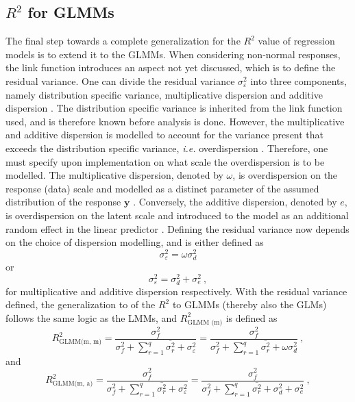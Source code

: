 \subsection{$R^2$ for GLMMs}
\label{sec:R2GLMM}
The final step towards a complete generalization for the $R^2$ value of regression models is to extend it to the GLMMs. 
When considering non-normal responses, the link function introduces an aspect not yet discussed, which is to define the residual variance.
One can divide the residual variance $\sigma^2_{\varepsilon}$ into three components, namely distribution specific variance, multiplicative dispersion and additive dispersion \citep{nakagawa2013general}.
The distribution specific variance is inherited from the link function used, and is therefore known before analysis is done. 
However, the multiplicative and additive dispersion is modelled to account for the variance present that exceeds the distribution specific variance, \textit{i.e.} overdispersion \citep{NakagawaSchielzeth2010}.
Therefore, one must specify upon implementation on what scale the overdispersion is to be modelled. 
The multiplicative dispersion, denoted by $\omega$, is overdispersion on the response (data) scale and modelled as a distinct parameter of the assumed distribution of the response $\mathbf{y}$ \citep{NakagawaSchielzeth2010}.
Conversely, the additive dispersion, denoted by $e$, is overdispersion on the latent scale and introduced to the model as an additional random effect in the linear predictor \citep{NakagawaSchielzeth2010}.
Defining the residual variance now depends on the choice of dispersion modelling, and is either defined as
\begin{equation}
    \sigma^2_{\varepsilon} = \omega \sigma^2_{d} 
\end{equation}
or 
\begin{equation}
    \sigma^2_{\varepsilon} = \sigma^2_{d} + \sigma^2_{e} \ ,
\end{equation}
for multiplicative and additive dispersion respectively.
With the residual variance defined, the generalization to of the $R^2$ to GLMMs (thereby also the GLMs) follows the same logic as the LMMs, and $R^2_{\text{GLMM (m)}}$ is defined as
\begin{equation}
    \label{eq:R2_GLMM_m_m}
    R^2_{\text{GLMM(m, m)}} = \frac{\sigma^2_f}{\sigma^2_f + \sum_{r=1}^{q}\overline{\sigma^2_{r}} + \sigma^2_{\varepsilon}} = \frac{\sigma^2_f}{\sigma^2_f + \sum_{r=1}^{q}\overline{\sigma^2_{r}} + \omega \sigma^2_{d}}\ ,
\end{equation}
and
\begin{equation}
    \label{eq:R2_GLMM_m_a}
    R^2_{\text{GLMM(m, a)}} = \frac{\sigma^2_f}{\sigma^2_f + \sum_{r=1}^{q}\overline{\sigma^2_{r}} + \sigma^2_{\varepsilon}} = \frac{\sigma^2_f}{\sigma^2_f + \sum_{r=1}^{q}\overline{\sigma^2_{r}} + \sigma^2_{d} + \sigma^2_{e}}\ ,
\end{equation}
